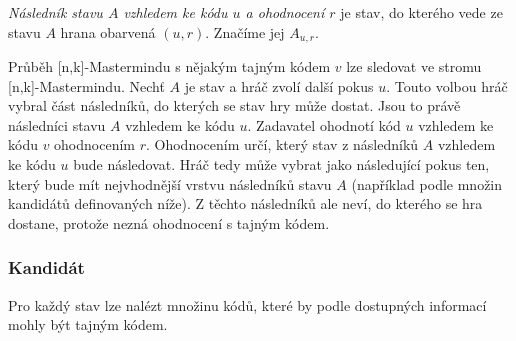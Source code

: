 \begin{definice}\label{potomek}
  
  \emph{Následník stavu $A$ vzhledem ke kódu $u$ a ohodnocení $r$} je stav, do kterého vede ze stavu $A$ hrana obarvená $(u,r)$. Značíme jej $A_{u,r}$. 
  
\end{definice}

Průběh [n,k]-Mastermindu s nějakým tajným kódem $v$ lze sledovat ve stromu [n,k]-Mastermindu. Nechť $A$ je stav a hráč zvolí další pokus $u$. Touto volbou hráč vybral část následníků, do kterých se stav hry může dostat. Jsou to právě následníci stavu $A$ vzhledem ke kódu $u$. Zadavatel ohodnotí kód $u$ vzhledem ke kódu $v$ ohodnocením $r$. Ohodnocením určí, který stav z následníků $A$ vzhledem ke kódu $u$ bude následovat. Hráč tedy může vybrat jako následující pokus ten, který bude mít nejvhodnější vrstvu následníků stavu $A$ (například podle množin kandidátů definovaných níže). Z těchto následníků ale neví, do kterého se hra dostane, protože nezná ohodnocení s tajným kódem. 


\subsubsection{Kandidát}
Pro každý stav lze nalézt množinu kódů, které by podle dostupných informací mohly být tajným kódem. 

